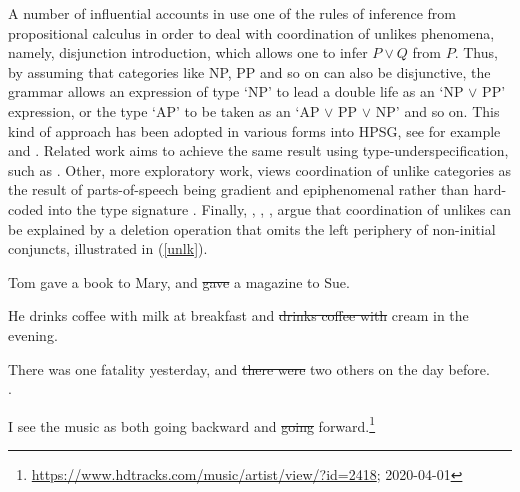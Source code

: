\documentclass[output=paper
                ,modfonts
                ,nonflat
	        ,collection
	        ,collectionchapter
	        ,collectiontoclongg
 	        ,biblatex
                ,babelshorthands
                ,newtxmath
                ,draftmode
                ,colorlinks, citecolor=brown
]{./langsci/langscibook}
\begin{document}
{\begin{exe}
\ex
\begin{xlista}
\end{xlista}\label{show2}
\end{exe}



A number of influential accounts in 
\citep{morrill90,morrill94,bayer}\addpages  use one of the rules of
inference from propositional calculus in order to deal with
coordination of unlikes phenomena, namely, disjunction introduction, which allows  one to infer $P \vee Q$ from  $P$.
Thus, by assuming that categories like NP, PP
and so on can also be disjunctive, the grammar allows an expression
of type `NP' to lead a double life as an `NP $\vee$ PP' expression,
or the type `AP' to be taken as an `AP $\vee$ PP $\vee$ NP' and so
on. This kind of approach has been adopted in various forms into HPSG, see for example \citet{Daniels02} and  \citet{Yatabe:04}.
Related work aims to achieve the same result using type-underspecification, such as 
 \citet{Sag:03}. Other, more exploratory work, views coordination of unlike categories as the result of   parts-of-speech being gradient and  epiphenomenal rather than hard-coded into the type signature  \citep{bookivan}.
 Finally,  
 \citet{berthold0}, \citet{yatabe},  \citet{Beavers},
 \citet{chaves06}  argue that
coordination of unlikes can be explained by
a deletion operation that omits the left periphery of
non-initial conjuncts, illustrated in   (\ref{unlk}).


\begin{exe}
\ex
\begin{xlista}
\ex Tom gave a book to Mary, and \sout{gave} a magazine to Sue. 

\ex He drinks coffee with milk at breakfast and \sout{drinks coffee with} cream in the evening.\\ \citep[]{hudson84}

\ex There was one fatality yesterday, and \sout{there were} two others on the day
before.\\
\citep[339]{chavesthesis}.

\ex I see the music as both going backward and \sout{going} forward.\footnote{
\url{https://www.hdtracks.com/music/artist/view/?id=2418}; 2020-04-01}
\end{xlista}\label{unlk}
\end{exe}

}
\end{document}
